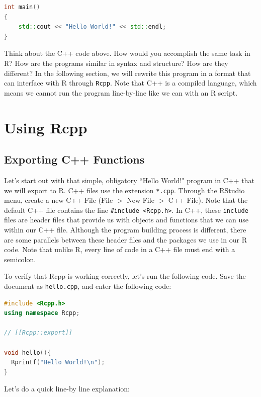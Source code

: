 \documentclass[12pt,oneside]{book}\usepackage[]{graphicx}\usepackage[]{color}
\begin{document}
{{{{\begin{lstlisting}[language=C++]
int main()
{
    std::cout << "Hello World!" << std::endl;
}
\end{lstlisting}
}

Think about the C++ code above. How would you accomplish the same task in R? How are the programs similar in syntax and structure? How are they different? In the following section, we will rewrite this program in a format that can interface with R through \verb+Rcpp+. Note that C++ is a compiled language, which means we cannot run the program line-by-line like we can with an R script.

\section{Using Rcpp}
\subsection{Exporting C++ Functions}
Let's start out with that simple, obligatory ``Hello World!" program in C++ that we will export to R. C++ files use the extension \verb+*.cpp+. Through the RStudio menu, create a new C++ File (File $>$ New File $>$ C++ File). Note that the default C++ file contains the line \verb+#include <Rcpp.h>+. In C++, these \verb+include+ files are header files that provide us with objects and functions that we can use within our C++ file. Although the program building process is different, there are some parallels between these header files and the packages we use in our R code. Note that unlike R, every line of code in a C++ file must end with a semicolon.

To verify that Rcpp is working correctly, let's run the following code. Save the document as \verb+hello.cpp+, and enter the following code:
{{
                
\begin{lstlisting}[language=C++]
#include <Rcpp.h>
using namespace Rcpp;

// [[Rcpp::export]]

void hello(){
  Rprintf("Hello World!\n");
}
\end{lstlisting}

}


Let's do a quick line-by line explanation:

}}}}
\end{document}
